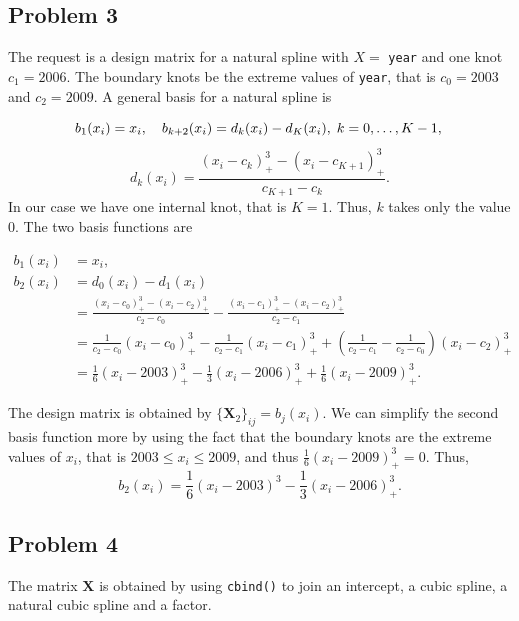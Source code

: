 \documentclass[]{article}
\begin{document}
\hypertarget{problem-3}{%
\subsection{Problem 3}\label{problem-3}}

The request is a design matrix for a natural spline with \(X =\)
\texttt{year} and one knot \(c_1 = 2006\). The boundary knots be the
extreme values of \texttt{year}, that is \(c_0 = 2003\) and
\(c_2 = 2009\). A general basis for a natural spline is

\[
b_1(x_i) = x_i, \quad b_{k+2}(x_i) = d_k(x_i)-d_K(x_i),\; k = 0, \ldots, K - 1,\\
\] \[
d_k(x_i) = \frac{(x_i-c_k)^3_+-(x_i-c_{K+1})^3_+}{c_{K+1}-c_k}.
\] In our case we have one internal knot, that is \(K=1\). Thus, \(k\)
takes only the value 0. The two basis functions are

\begin{align*}
b_1(x_i) &= x_i,\\
b_2(x_i) &= d_0(x_i)-d_1(x_i)\\
&= \frac{(x_i-c_0)^3_+-(x_i-c_2)^3_+}{c_2-c_0} - \frac{(x_i-c_1)^3_+-(x_i-c_2)^3_+}{c_2-c_1}\\
&= \frac{1}{c_2-c_0}(x_i-c_0)^3_+ - \frac{1}{c_2-c_1}(x_i-c_1)^3_+ + \left(\frac{1}{c_2-c_1}-\frac{1}{c_2-c_0}\right)(x_i-c_{2})^3_+\\
&= \frac{1}{6}(x_i-2003)^3_+ - \frac{1}{3}(x_i-2006)^3_+ + \frac{1}{6}(x_i-2009)^3_+.
\end{align*}

The design matrix is obtained by \(\{\mathbf X_2\}_{ij} = b_j(x_i)\). We
can simplify the second basis function more by using the fact that the
boundary knots are the extreme values of \(x_i\), that is
\(2003 \leq x_i \leq 2009\), and thus \(\frac{1}{6}(x_i-2009)^3_+=0\).
Thus, \[
b_2(x_i) = \frac{1}{6}(x_i-2003)^3 - \frac{1}{3}(x_i-2006)^3_+.
\]

\hypertarget{problem-4}{%
\subsection{Problem 4}\label{problem-4}}

The matrix \(\mathbf X\) is obtained by using \texttt{cbind()} to join
an intercept, a cubic spline, a natural cubic spline and a factor.
\end{document}

